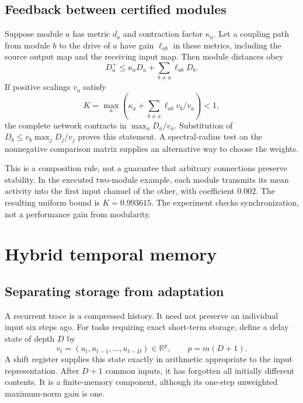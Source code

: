 \documentclass[11pt,a4paper]{article}
\theoremstyle{definition}\newtheorem{definition}[theorem]{Definition}
\newcommand{\R}{\mathbb{R}}
\begin{document}
\subsection{Feedback between certified modules}
Suppose module $a$ has metric $d_a$ and contraction factor $\kappa_a$. Let a coupling path from module $b$ to the drive of $a$ have gain $\ell_{ab}$ in these metrics, including the source output map and the receiving input map. Then module distances obey
\begin{equation}
 D_a^+\leq\kappa_aD_a+\sum_{b\ne a}\ell_{ab}D_b. \label{eq:module}
\end{equation}
If positive scalings $v_a$ satisfy
\begin{equation}
 K=\max_a\left(\kappa_a+\sum_{b\ne a}\ell_{ab}v_b/v_a\right)<1, \label{eq:modulecriterion}
\end{equation}
the complete network contracts in $\max_a D_a/v_a$. Substitution of $D_b\leq v_b\max_jD_j/v_j$ proves this statement. A spectral-radius test on the nonnegative comparison matrix supplies an alternative way to choose the weights.

This is a composition rule, not a guarantee that arbitrary connections preserve stability. In the executed two-module example, each module transmits its mean activity into the first input channel of the other, with coefficient $0.002$. The resulting uniform bound is $K=0.993615$. The experiment checks synchronization, not a performance gain from modularity.

\section{Hybrid temporal memory}
\subsection{Separating storage from adaptation}
A recurrent trace is a compressed history. It need not preserve an individual input six steps ago. For tasks requiring exact short-term storage, define a delay state of depth $D$ by
\begin{equation}
 v_t=(u_t,u_{t-1},\ldots,u_{t-D})\in\R^p,\qquad p=m(D+1). \label{eq:delay}
\end{equation}
A shift register supplies this state exactly in arithmetic appropriate to the input representation. After $D+1$ common inputs, it has forgotten all initially different contents. It is a finite-memory component, although its one-step unweighted maximum-norm gain is one.
\end{document}
